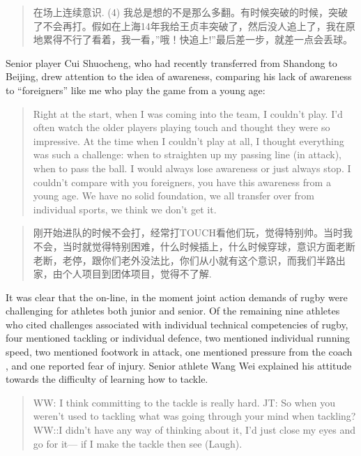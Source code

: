 \begin{CJK}{UTF8}{gbsn}
  \begin{quotation}
    在场上连续意识. (4) 我总是想的不是那么多翻。有时候突破的时候，突破了不会再打。假如在上海14年我给王贞丰突破了，然后没人追上了，我在原地累得不行了看着，我一看，''哦！快追上!''最后差一步，就差一点会丢球。
  \end{quotation}

Senior player Cui Shuocheng, who had recently transferred from Shandong to Beijing, drew attention to the idea of awareness, comparing his lack of awareness to ``foreigners'' like me who play the game from a young age:

    \begin{quotation}
      Right at the start, when I was coming into the team, I couldn't play. I'd often watch the older players playing touch and thought they were so impressive.  At the time when I couldn't play at all, I thought everything was such a challenge: when to straighten up my passing line (in attack), when to pass the ball.  I would always lose awareness or just always stop. I couldn't compare with you foreigners, you have this awareness from a young age.  We have no solid foundation, we all transfer over from individual sports, we think we don't get it.
    \end{quotation}

    \begin{quotation}
      刚开始进队的时候不会打，经常打TOUCH看他们玩，觉得特别帅。当时我不会，当时就觉得特别困难，什么时候插上，什么时候穿球，意识方面老断老断，老停，跟你们老外没法比，你们从小就有这个意识，而我们半路出家，由个人项目到团体项目，觉得不了解.
    \end{quotation}

It was clear that the on-line, in the moment joint action demands of rugby were challenging for athletes both junior and senior.  Of the remaining nine athletes who cited challenges associated with individual technical competencies of rugby, four mentioned tackling or individual defence, two mentioned individual running speed, two mentioned footwork in attack, one mentioned pressure from the coach , and one reported fear of injury.  Senior athlete Wang Wei explained his attitude towards the difficulty of learning how to tackle.

\begin{quotation}
  WW: I think committing to the tackle is really hard.
  JT: So when you weren’t used to tackling what was going through your mind when tackling?
  WW::I didn’t have any way of thinking about it, I’d just close my eyes and go for it--- if I make the tackle then see (Laugh).
\end{quotation}


\end{CJK}
